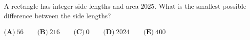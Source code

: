 A rectangle has integer side lengths and area $2025$. What is the smallest possible difference between the side lengths?

$\textbf{(A)}~56\qquad\textbf{(B)}~216\qquad\textbf{(C)}~0\qquad\textbf{(D)}~2024\qquad\textbf{(E)}~400\qquad$
